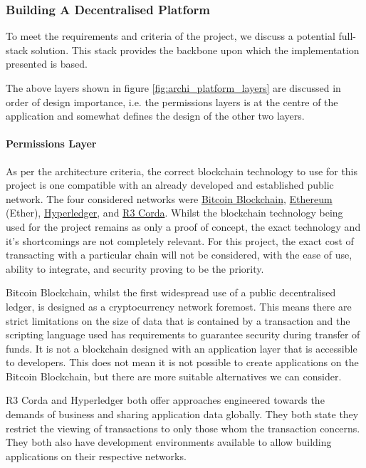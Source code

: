 \subsubsection{Building A Decentralised Platform}

To meet the requirements and criteria of the project, we discuss a potential full-stack solution. This stack provides the backbone upon which the implementation presented is based.



The above layers shown in figure \ref{fig:archi_platform_layers} are discussed in order of design importance, i.e. the permissions layers is at the centre of the application and somewhat defines the design of the other two layers.

\paragraph{Permissions Layer}

As per the architecture criteria, the correct blockchain technology to use for this project is one compatible with an already developed and established public network. The four considered networks were \href{https://bitcoin.org/en/}{Bitcoin Blockchain}, \href{https://www.ethereum.org/}{Ethereum} (Ether), \href{https://www.hyperledger.org/}{Hyperledger}, and \href{https://www.corda.net/}{R3 Corda}. Whilst the blockchain technology being used for the project remains as only a proof of concept, the exact technology and it's shortcomings are not completely relevant. For this project, the exact cost of transacting with a particular chain will not be considered, with the ease of use, ability to integrate, and security proving to be the priority.

Bitcoin Blockchain, whilst the first widespread use of a public decentralised ledger, is designed as a cryptocurrency network foremost. This means there are strict limitations on the size of data that is contained by a transaction and the scripting language used has requirements to guarantee security during transfer of funds. It is not a blockchain designed with an application layer that is accessible to developers. This does not mean it is not possible to create applications on the Bitcoin Blockchain, but there are more suitable alternatives we can consider.

R3 Corda and Hyperledger both offer approaches engineered towards the demands of business and sharing application data globally. They both state they restrict the viewing of transactions to only those whom the transaction concerns. They both also have development environments available to allow building applications on their respective networks.

